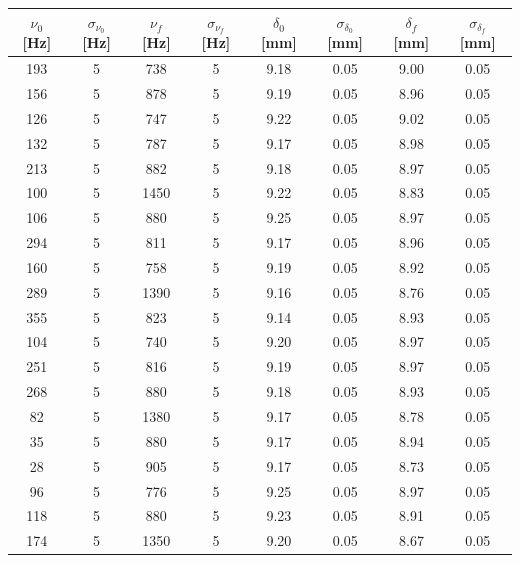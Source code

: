 \documentclass{article}
\begin{document}
            \begin{table}[H]

                \centering
                \begin{tabular}{c c c c c c c c} 

                    \toprule
                    $\nu_0$ [Hz] & $\sigma_{\nu_0}$ [Hz] & $\nu_f$ [Hz] &  $\sigma_{\nu_f}$ [Hz] & 
                    $\delta_0$ [mm] & $\sigma_{\delta_0}$ [mm] & $\delta_f$ [mm] & $\sigma_{\delta_f}$ [mm] \\ 
                    
                    \midrule
                        193 & 5 & 738   & 5 & 9.18 & 0.05 & 9.00 & 0.05  \\ 
                        156 & 5 & 878   & 5 & 9.19 & 0.05 & 8.96 & 0.05  \\ 
                        126 & 5 & 747   & 5 & 9.22 & 0.05 & 9.02 & 0.05  \\ 
                        132 & 5 & 787   & 5 & 9.17 & 0.05 & 8.98 & 0.05  \\ 
                        213 & 5 & 882   & 5 & 9.18 & 0.05 & 8.97 & 0.05  \\ 
                        100 & 5 & 1450  & 5 & 9.22 & 0.05 & 8.83 & 0.05  \\ 
                        106 & 5 & 880   & 5 & 9.25 & 0.05 & 8.97 & 0.05  \\ 
                        294 & 5 & 811   & 5 & 9.17 & 0.05 & 8.96 & 0.05  \\ 
                        160 & 5 & 758   & 5 & 9.19 & 0.05 & 8.92 & 0.05  \\ 
                        289 & 5 & 1390  & 5 & 9.16 & 0.05 & 8.76 & 0.05  \\ 
                        355 & 5 & 823   & 5 & 9.14 & 0.05 & 8.93 & 0.05  \\ 
                        104 & 5 & 740   & 5 & 9.20 & 0.05 & 8.97 & 0.05  \\ 
                        251 & 5 & 816   & 5 & 9.19 & 0.05 & 8.97 & 0.05  \\ 
                        268 & 5 & 880   & 5 & 9.18 & 0.05 & 8.93 & 0.05  \\ 
                        82  & 5 & 1380  & 5 & 9.17 & 0.05 & 8.78 & 0.05  \\ 
                        35  & 5 & 880   & 5 & 9.17 & 0.05 & 8.94 & 0.05  \\ 
                        28  & 5 & 905   & 5 & 9.17 & 0.05 & 8.73 & 0.05  \\ 
                        96  & 5 & 776   & 5 & 9.25 & 0.05 & 8.97 & 0.05  \\ 
                        118 & 5 & 880   & 5 & 9.23 & 0.05 & 8.91 & 0.05  \\ 
                        174 & 5 & 1350  & 5 & 9.20 & 0.05 & 8.67 & 0.05  \\ 
            

\end{tabular}
\end{table}
\end{document}

